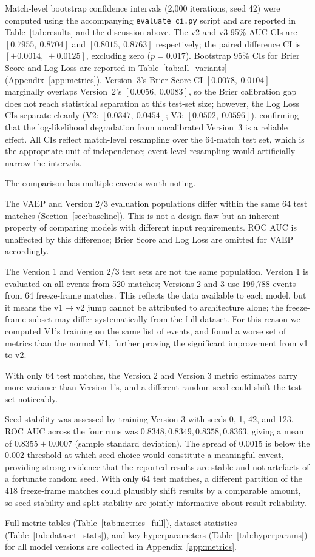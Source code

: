 Match-level bootstrap confidence intervals (2,000 iterations, seed 42) were computed using the accompanying \texttt{evaluate\_ci.py} script and are reported in Table~\ref{tab:results} and the discussion above. The v2 and v3 95\% AUC CIs are $[0.7955,\ 0.8704]$ and $[0.8015,\ 0.8763]$ respectively; the paired difference CI is $[+0.0014,\ +0.0125]$, excluding zero ($p = 0.017$). Bootstrap 95\% CIs for Brier Score and Log Loss are reported in Table~\ref{tab:all_variants} (Appendix~\ref{app:metrics}). Version~3's Brier Score CI $[0.0078,\ 0.0104]$ marginally overlaps Version~2's $[0.0056,\ 0.0083]$, so the Brier calibration gap does not reach statistical separation at this test-set size; however, the Log Loss CIs separate cleanly (V2: $[0.0347,\ 0.0454]$; V3: $[0.0502,\ 0.0596]$), confirming that the log-likelihood degradation from uncalibrated Version~3 is a reliable effect. All CIs reflect match-level resampling over the 64-match test set, which is the appropriate unit of independence; event-level resampling would artificially narrow the intervals.

The comparison has multiple caveats worth noting.

The VAEP and Version 2/3 evaluation populations differ within the same 64 test matches (Section~\ref{sec:baseline}). This is not a design flaw but an inherent property of comparing models with different input requirements. ROC AUC is unaffected by this difference; Brier Score and Log Loss are omitted for VAEP accordingly.

The Version 1 and Version 2/3 test sets are not the same population. Version 1 is evaluated on all events from 520 matches; Versions 2 and 3 use 199,788 events from 64 freeze-frame matches. This reflects the data available to each model, but it means the v1$\to$v2 jump cannot be attributed to architecture alone; the freeze-frame subset may differ systematically from the full dataset. For this reason we computed V1's training on the same list of events, and found a worse set of metrics than the normal V1, further proving the significant improvement from v1 to v2.

With only 64 test matches, the Version 2 and Version 3 metric estimates carry more variance than Version 1's, and a different random seed could shift the test set noticeably.

Seed stability was assessed by training Version 3 with seeds 0, 1, 42, and 123. ROC AUC across the four runs was $0.8348, 0.8349, 0.8358, 0.8363$, giving a mean of $0.8355 \pm 0.0007$ (sample standard deviation). The spread of $0.0015$ is below the $0.002$ threshold at which seed choice would constitute a meaningful caveat, providing strong evidence that the reported results are stable and not artefacts of a fortunate random seed. With only 64 test matches, a different partition of the 418 freeze-frame matches could plausibly shift results by a comparable amount, so seed stability and split stability are jointly informative about result reliability.

Full metric tables (Table~\ref{tab:metrics_full}), dataset statistics (Table~\ref{tab:dataset_stats}), and key hyperparameters (Table~\ref{tab:hyperparams}) for all model versions are collected in Appendix~\ref{app:metrics}.
